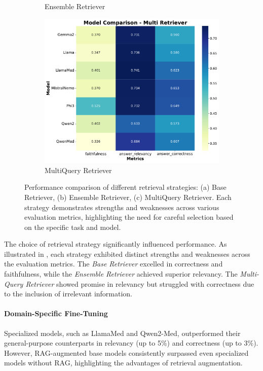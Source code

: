 \begin{figure}[h]
\begin{subfigure}{0.49\textwidth}
    \caption{Ensemble Retriever}
  \end{subfigure}
  \begin{subfigure}{0.49\textwidth}
    \includegraphics[width=\textwidth]{figures/heatmap_Multi}
    \caption{MultiQuery Retriever}
  \end{subfigure}
  \caption[Performance comparison of different retrieval strategies]{
      Performance comparison of different retrieval strategies: (a) Base Retriever, (b) Ensemble Retriever, (c) MultiQuery Retriever.
      Each strategy demonstrates strengths and weaknesses across various evaluation metrics, highlighting the need for careful selection based on the specific task and model.
  }
  \label{fig:retrievers}
\end{figure}
%
The choice of retrieval strategy significantly influenced performance.
%
As illustrated in , each strategy exhibited distinct strengths and weaknesses across the evaluation metrics.
%
The \textit{Base Retriever} excelled in correctness and faithfulness, while the \textit{Ensemble Retriever} achieved superior relevancy.
%
The \textit{Multi-Query Retriever} showed promise in relevancy but struggled with correctness due to the inclusion of irrelevant information.

\paragraph{Domain-Specific Fine-Tuning}
%
Specialized models, such as LlamaMed and Qwen2-Med, outperformed their general-purpose counterparts in relevancy (up to 5\%) and correctness (up to 3\%).
%
However, \gls{RAG}-augmented base models consistently surpassed even specialized models without \gls{RAG}, highlighting the advantages of retrieval augmentation.


